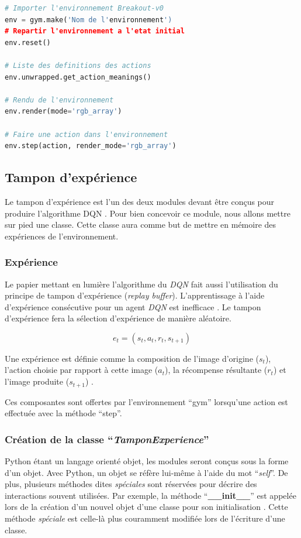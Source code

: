 \documentclass{article}
\begin{document}
\bigbreak
\begin{lstlisting}[language=Python, caption={Initilisation Gym pour Atari Breakout v0}, label={code:initgym}]
# Importer l'environnement Breakout-v0
env = gym.make('Nom de l'environnement')
# Repartir l'environnement a l'etat initial
env.reset()

# Liste des definitions des actions
env.unwrapped.get_action_meanings()

# Rendu de l'environnement
env.render(mode='rgb_array')

# Faire une action dans l'environnement
env.step(action, render_mode='rgb_array')
\end{lstlisting}


\subsection{Tampon d'expérience}
Le tampon d'expérience est l'un des deux modules devant être conçus pour produire l'algorithme DQN \citep{DQN-Article}. Pour bien concevoir ce module, nous allons mettre sur pied une classe. Cette classe aura comme but de mettre en mémoire des expériences de l'environnement.

\subsubsection{Expérience}
Le papier mettant en lumière l'algorithme du \textit{DQN} fait aussi l'utilisation du principe de tampon d'expérience (\textit{replay buffer}). L'apprentissage à l'aide d'expérience consécutive pour un agent \textit{DQN} est inefficace \citep{DQN-Article}. Le tampon d'expérience fera la sélection d'expérience de manière aléatoire.

\medbreak
$$e_{t} = (s_{t},a_{t},r_{t},s_{t+1})$$

\bigbreak
Une expérience est définie comme la composition de l'image d'origine ($s_{t}$), l'action choisie par rapport à cette image ($a_{t}$), la récompense résultante ($r_{t}$) et l'image produite ($s_{t+1}$) \citep{DQN-Article}.

\bigbreak
Ces composantes sont offertes par l'environnement ``gym'' lorsqu'une action est effectuée avec la méthode ``step''.

\subsubsection{Création de la classe ``\textit{TamponExperience}''}
Python étant un langage orienté objet, les modules seront conçus sous la forme d'un objet. Avec Python, un objet se réfère lui-même à l'aide du mot ``\textit{self}''. De plus, plusieurs méthodes dites \textit{spéciales} sont réservées pour décrire des interactions souvent utilisées. Par exemple, la méthode ``\textbf{\_\_init\_\_}'' est appelée lors de la création d'un nouvel objet d'une classe pour son initialisation \citep{Python-Method}. Cette méthode \textit{spéciale} est celle-là plus couramment modifiée lors de l'écriture d'une classe.
\end{document}
